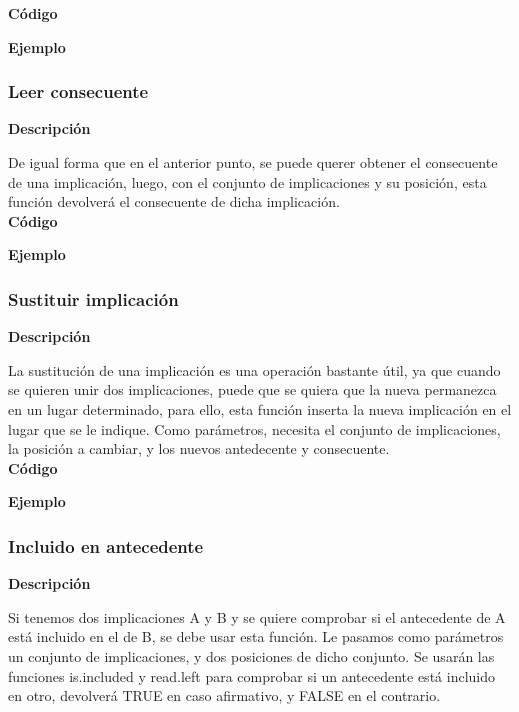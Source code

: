     \textbf{C\'odigo}

    


    \textbf{Ejemplo}


\subsubsection{Leer consecuente}

    \textbf{Descripci\'on}
    
    De igual forma que en el anterior punto, se puede querer obtener el consecuente de una implicaci\'on, luego, con el conjunto de 
    implicaciones y su posici\'on, esta funci\'on devolver\'a el consecuente de dicha implicaci\'on.
    \\


    \textbf{C\'odigo}

    

    \textbf{Ejemplo}


\subsubsection{Sustituir implicaci\'on}

    \textbf{Descripci\'on}

    La sustituci\'on de una implicaci\'on es una operaci\'on bastante \'util, ya que cuando se quieren unir dos implicaciones, puede que 
    se quiera que la nueva permanezca en un lugar determinado, para ello, esta funci\'on inserta la nueva implicaci\'on en el lugar que 
    se le indique. Como par\'ametros, necesita el conjunto de implicaciones, la posici\'on a cambiar, y los nuevos antedecente y consecuente.
    \\


    \textbf{C\'odigo}

    

    \textbf{Ejemplo}


\subsubsection{Incluido en antecedente}

    \textbf{Descripci\'on}

    Si tenemos dos implicaciones A y B y se quiere comprobar si el antecedente de A est\'a incluido en el de B, se debe usar 
    esta funci\'on. Le pasamos como par\'ametros un conjunto de implicaciones, y dos posiciones de dicho conjunto. Se usar\'an 
    las funciones is.included y read.left para comprobar si un antecedente est\'a incluido en otro, devolver\'a TRUE en caso 
    afirmativo, y FALSE en el contrario.
    \\


